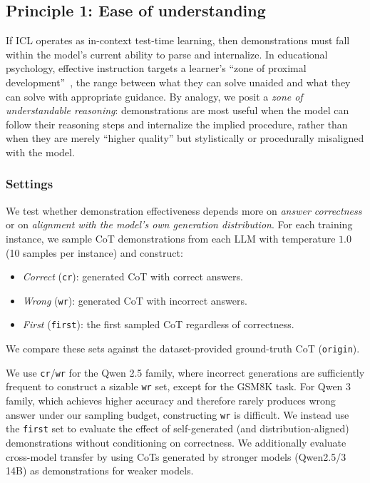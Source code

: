 \documentclass{llmxive}
\begin{document}
\subsection{Principle 1: Ease of understanding}
\label{sec:understanding}
If ICL operates as in-context test-time learning, then demonstrations must fall within the model's current ability to parse and internalize.
In educational psychology, effective instruction targets a learner's ``zone of proximal development''~\cite{zoneofproximity}, the range between what they can solve unaided and what they can solve with appropriate guidance.
By analogy, we posit a \emph{zone of understandable reasoning}: demonstrations are most useful when the model can follow their reasoning steps and internalize the implied procedure, rather than when they are merely ``higher quality'' but stylistically or procedurally misaligned with the model.


\subsubsection{Settings} 

We test whether demonstration effectiveness depends more on \emph{answer correctness} or on \emph{alignment with the model's own generation distribution}.
For each training instance, we sample CoT demonstrations from each LLM with temperature $1.0$ (10 samples per instance) and construct:




\begin{itemize}
    \vspace{-2mm}
    \setlength{\itemsep}{1pt}    %
    \setlength{\parsep}{1pt}     %
    \item \emph{Correct} (\texttt{cr}): generated CoT with correct answers.
    \item \emph{Wrong} (\texttt{wr}): generated CoT with incorrect answers.
    \item \emph{First} (\texttt{first}): the first sampled CoT regardless of correctness.
    \vspace{-2mm}
\end{itemize}

We compare these sets against the dataset-provided ground-truth CoT (\texttt{origin}).

We use \texttt{cr}/\texttt{wr} for the Qwen 2.5 family, where incorrect generations are sufficiently frequent to construct a sizable \texttt{wr} set, except for the GSM8K task.
For Qwen 3 family, which achieves higher accuracy and therefore rarely produces wrong answer under our sampling budget, constructing \texttt{wr} is difficult. We instead use the \texttt{first} set to evaluate the effect of self-generated (and distribution-aligned) demonstrations without conditioning on correctness. We additionally evaluate cross-model transfer by using CoTs generated by stronger models (Qwen2.5/3 14B) as demonstrations for weaker models.
\end{document}
